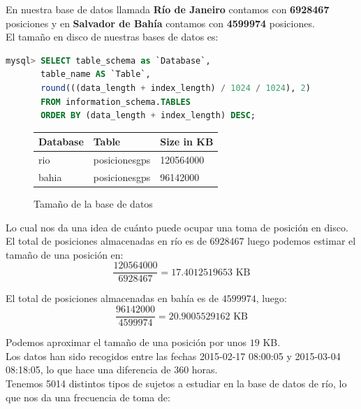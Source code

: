 \documentclass[a4paper, 12pt]{article}
\begin{document}
En nuestra base de datos llamada \textbf{R\'io de Janeiro} contamos con \textbf{6928467} posiciones y en \textbf{Salvador de Bah\'ia} contamos con \textbf{4599974} posiciones.\\

El tama\~no en disco de nuestras bases de datos es:\\

\begin{lstlisting}[language=sql, basicstyle=\small, columns=fullflexible, frame=tbrl, showstringspaces=false]
mysql> SELECT table_schema as `Database`, 
	   table_name AS `Table`,  
	   round(((data_length + index_length) / 1024 / 1024), 2) 
	   FROM information_schema.TABLES  
	   ORDER BY (data_length + index_length) DESC;

\end{lstlisting}

\begin{figure}
	\centering
	\begin{tabular}{| l | l | l |}
	\hline
	\hline
	\cellcolor{green!25}Database & 
	\cellcolor{green!25}Table & 
	\cellcolor{green!25}Size in KB \\
	\hline
	\hline
	rio & posicionesgps & 120564000 \\
	bahia & posicionesgps & 96142000 \\
	\hline
	\end{tabular}
	\caption{Tama\~no de la base de datos}
\end{figure}

Lo cual nos da una idea de cu\'anto puede ocupar una toma de posici\'on en disco.\\

El total de posiciones almacenadas en r\'io es de $6928467$ luego podemos estimar el tama\~no de una posici\'on en: \\
$$\frac{120564000}{6928467} = 17.4012519653 \text{ KB}$$ 

El total de posiciones almacenadas en bah\'ia es de $4599974$, luego:
$$\frac{96142000}{4599974} = 20.9005529162 \text{ KB}$$

Podemos aproximar el tama\~no de una posici\'on por unos $19$ KB. \\

Los datos han sido recogidos entre las fechas 2015-02-17 08:00:05 y 2015-03-04 08:18:05, lo que hace una diferencia de 360 horas.\\

Tenemos 5014 distintos tipos de sujetos a estudiar en la base de datos de r\'io, lo que nos da una frecuencia de toma de:
\end{document}
